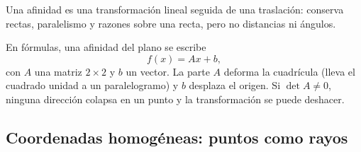 \begin{idea}[Idea]
Una afinidad es una transformación lineal seguida de una traslación: conserva rectas,
paralelismo y razones sobre una recta, pero no distancias ni ángulos.
\end{idea}

En fórmulas, una afinidad del plano se escribe
\[
  f(x)=Ax+b,
\]
con \(A\) una matriz \(2\times2\) y \(b\) un vector. La parte \(A\) deforma la cuadrícula
(lleva el cuadrado unidad a un paralelogramo) y \(b\) desplaza el origen. Si \(\det A\neq0\),
ninguna dirección colapsa en un punto y la transformación se puede deshacer.

\subsection{Coordenadas homogéneas: puntos como rayos}\label{sec:homogeneas-primera}

{\small\vspace{1mm}\par}

